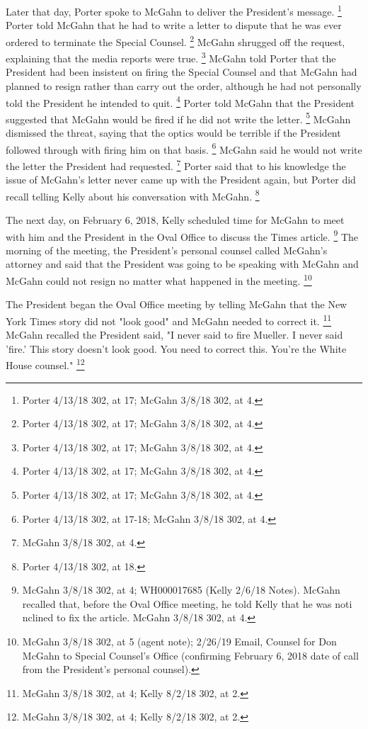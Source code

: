 Later that day, Porter spoke to McGahn to deliver the President's message.%
\footnote{Porter 4/13/18 302, at 17;
McGahn 3/8/18 302, at 4.}
Porter told McGahn that he had to write a letter to dispute that he was ever ordered to terminate the Special Counsel.%
\footnote{Porter 4/13/18 302, at 17;
McGahn 3/8/18 302, at 4.}
McGahn shrugged off the request, explaining that the media reports were true.%
\footnote{Porter 4/13/18 302, at 17;
McGahn 3/8/18 302, at 4.}
McGahn told Porter that the President had been insistent on firing the Special Counsel and that McGahn had planned to resign rather than carry out the order, although he had not personally told the President he intended to quit.%
\footnote{Porter 4/13/18 302, at 17;
McGahn 3/8/18 302, at 4.}
Porter told McGahn that the President suggested that McGahn would be fired if he did not write the letter.%
\footnote{Porter 4/13/18 302, at 17;
McGahn 3/8/18 302, at 4.}
McGahn dismissed the threat, saying that the optics would be terrible if the President followed through with firing him on that basis.%
\footnote{Porter 4/13/18 302, at 17-18;
McGahn 3/8/18 302, at 4.}
McGahn said he would not write the letter the President had requested.%
\footnote{McGahn 3/8/18 302, at 4.}
Porter said that to his knowledge the issue of McGahn's letter never came up with the President again, but Porter did recall telling Kelly about his conversation with McGahn.%
\footnote{Porter 4/13/18 302, at 18.}

The next day, on February 6, 2018, Kelly scheduled time for McGahn to meet with him and the President in the Oval Office to discuss the Times article.%
\footnote{McGahn 3/8/18 302, at 4;
WH000017685 (Kelly 2/6/18 Notes).
McGahn recalled that, before the Oval Office meeting, he told Kelly that he was noti nclined to fix the article.
McGahn 3/8/18 302, at 4.}
The morning of the meeting, the President's personal counsel called McGahn's attorney and said that the President was going to be speaking with McGahn and McGahn could not resign no matter what happened in the meeting.%
\footnote{McGahn 3/8/18 302, at 5 (agent note);
2/26/19 Email, Counsel for Don McGahn to Special Counsel’s Office (confirming February 6, 2018 date of call from the President’s personal counsel).}

The President began the Oval Office meeting by telling McGahn that the New York Times story did not "look good" and McGahn needed to correct it.%
\footnote{McGahn 3/8/18 302, at 4; Kelly 8/2/18 302, at 2.}
McGahn recalled the President said, "I never said to fire Mueller.
I never said 'fire.'
This story doesn't look good.
You need to correct this.
You're the White House counsel."%
\footnote{McGahn 3/8/18 302, at 4; Kelly 8/2/18 302, at 2.}

